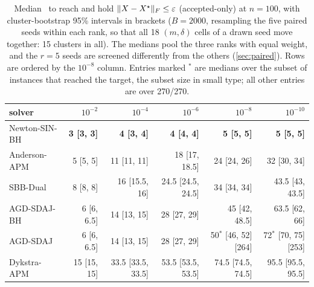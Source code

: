 

\begin{table}[t]
\centering
\caption{Median \EVDs\ to reach and hold $\lVert X-X^\star\rVert_F\le\varepsilon$
(accepted-only) at $n=100$, with cluster-bootstrap 95\% intervals in brackets
($B=2000$, resampling the five paired seeds within each rank, so that all 18
$(m,\delta)$ cells of a drawn seed move together: 15 clusters in all). The
medians pool the three ranks with equal weight, and the $r=5$ seeds are
screened differently from the others (\cref{sec:paired}). Rows are ordered by the
$10^{-8}$ column. Entries marked $^{*}$ are medians over the subset of instances
that reached the target, the subset size in small type; all other entries are
over 270/270.}
\label{tab:fwd}
\small
\setlength{\tabcolsep}{4pt}
\begin{tabular}{lrrrrr}
\toprule
solver & $10^{-2}$ & $10^{-4}$ & $10^{-6}$ & $10^{-8}$ & $10^{-10}$\\
\midrule
Newton-SIN-BH & \textbf{3 [3, 3]} & \textbf{4 [3, 4]} & \textbf{4 [4, 4]} & \textbf{5 [5, 5]} & \textbf{5 [5, 5]}\\
Anderson-APM & 5 [5, 5] & 11 [11, 11] & 18 [17, 18.5] & 24 [24, 26] & 32 [30, 34]\\
SBB-Dual & 8 [8, 8] & 16 [15.5, 16] & 24.5 [24.5, 24.5] & 34 [34, 34] & 43.5 [43, 43.5]\\
AGD-SDAJ-BH & 6 [6, 6.5] & 14 [13, 15] & 28 [27, 29] & 45 [42, 48.5] & 63.5 [62, 66]\\
AGD-SDAJ & 6 [6, 6.5] & 14 [13, 15] & 28 [27, 29] & 50$^{*}$ [46, 52] \tiny[264] & 72$^{*}$ [70, 75] \tiny[253]\\
Dykstra-APM & 15 [15, 15] & 33.5 [33.5, 33.5] & 53.5 [53.5, 53.5] & 74.5 [74.5, 74.5] & 95.5 [95.5, 95.5]\\
\bottomrule
\end{tabular}
\end{table}

